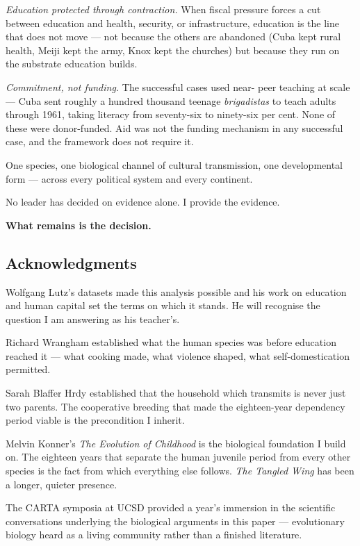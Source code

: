 \documentclass[12pt,letterpaper]{article}
\begin{document}
\emph{Education protected through contraction.} When fiscal
pressure forces a cut between education and health, security, or
infrastructure, education is the line that does not move --- not
because the others are abandoned (Cuba kept rural health, Meiji
kept the army, Knox kept the churches) but because they run on
the substrate education builds.

\emph{Commitment, not funding.} The successful cases used near-
peer teaching at scale --- Cuba sent roughly a hundred thousand
teenage \emph{brigadistas} to teach adults through 1961, taking
literacy from seventy-six to ninety-six per cent. None of these
were donor-funded. Aid was not the funding mechanism in any
successful case, and the framework does not require it.

One species, one biological channel of cultural transmission, one
developmental form --- across every political system and every
continent.

No leader has decided on evidence alone. I provide the evidence.

\textbf{What remains is the decision.}

\subsection*{Acknowledgments}

Wolfgang Lutz's datasets made this analysis possible and his work on
education and human capital set the terms on which it stands. He will
recognise the question I am answering as his teacher's.

Richard Wrangham established what the human species was before
education reached it --- what cooking made, what violence shaped, what
self-domestication permitted.

Sarah Blaffer Hrdy established that the household which transmits is
never just two parents. The cooperative breeding that made the
eighteen-year dependency period viable is the precondition I
inherit.

Melvin Konner's \emph{The Evolution of Childhood} is the biological
foundation I build on. The eighteen years that separate the
human juvenile period from every other species is the fact from which
everything else follows. \emph{The Tangled Wing} has been a longer,
quieter presence.

The CARTA symposia at UCSD provided a year's immersion in the
scientific conversations underlying the biological arguments in this
paper --- evolutionary biology heard as a living community rather than
a finished literature.
\end{document}
